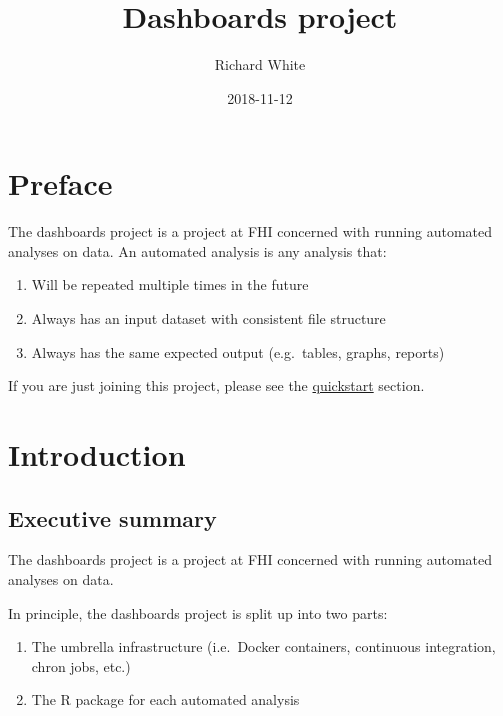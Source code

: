 \documentclass[12pt,]{article}
\title{Dashboards project}
\author{Richard White}
\date{2018-11-12}
\providecommand{\tightlist}{%
  \setlength{\itemsep}{0pt}\setlength{\parskip}{0pt}}
\begin{document}
\maketitle

{
\hypersetup{linkcolor=black}
\setcounter{tocdepth}{2}
\tableofcontents
}
\listoftables
\listoffigures
\section*{Preface}\label{preface}

The dashboards project is a project at FHI concerned with running
automated analyses on data. An automated analysis is any analysis that:

\begin{enumerate}
\def\labelenumi{\arabic{enumi}.}
\tightlist
\item
  Will be repeated multiple times in the future
\item
  Always has an input dataset with consistent file structure
\item
  Always has the same expected output (e.g.~tables, graphs, reports)
\end{enumerate}

If you are just joining this project, please see the
\protect\hyperlink{quickstart}{quickstart} section.

\section{Introduction}\label{introduction}

\subsection{Executive summary}\label{executive-summary}

The dashboards project is a project at FHI concerned with running
automated analyses on data.

In principle, the dashboards project is split up into two parts:

\begin{enumerate}
\def\labelenumi{\arabic{enumi}.}
\tightlist
\item
  The umbrella infrastructure (i.e.~Docker containers, continuous
  integration, chron jobs, etc.)
\item
  The R package for each automated analysis
\end{enumerate}
\end{document}
